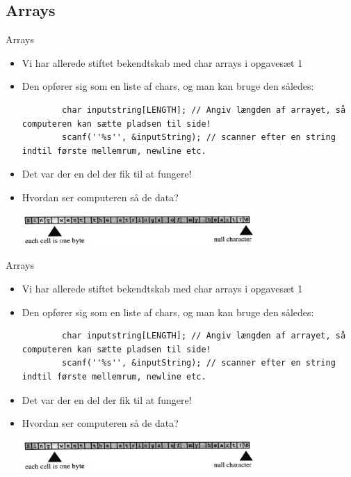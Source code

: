 \documentclass{beamer}
\begin{document}
\subsection{Arrays}

\begin{frame}[fragile]{Arrays}
	\begin{itemize}
		\item{Vi har allerede stiftet bekendtskab med char arrays i opgavesæt 1}
		\item{Den opfører sig som en liste af chars, og man kan bruge den således:}
		\begin{lstlisting}
		char inputstring[LENGTH]; // Angiv længden af arrayet, så computeren kan sætte pladsen til side!
		scanf(''%s'', &inputString); // scanner efter en string indtil første mellemrum, newline etc.
		\end{lstlisting}
		\item{Det var der en del der fik til at fungere!}
		\item{Hvordan ser computeren så de data?}
		\begin{center}
		\includegraphics[width=0.7\textwidth]{assets/char_array.png}
		\end{center}
	\end{itemize}
\end{frame}


\begin{frame}[fragile]{Arrays}
	\begin{itemize}
		\item{Vi har allerede stiftet bekendtskab med char arrays i opgavesæt 1}
		\item{Den opfører sig som en liste af chars, og man kan bruge den således:}
		\begin{lstlisting}
		char inputstring[LENGTH]; // Angiv længden af arrayet, så computeren kan sætte pladsen til side!
		scanf(''%s'', &inputString); // scanner efter en string indtil første mellemrum, newline etc.
		\end{lstlisting}
		\item{Det var der en del der fik til at fungere!}
		\item{Hvordan ser computeren så de data?}
		\begin{center}
		\includegraphics[width=0.7\textwidth]{assets/char_array.png}
		\end{center}
	\end{itemize}
\end{frame}
\end{document}
